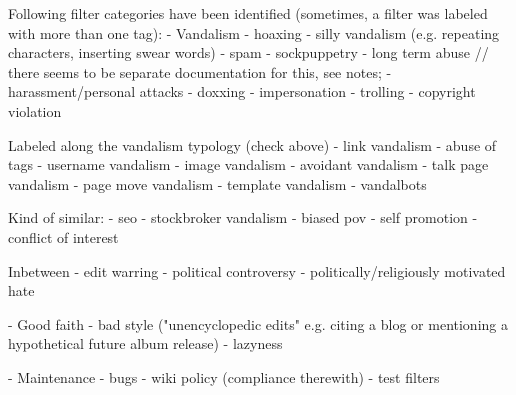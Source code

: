 Following filter categories have been identified (sometimes, a filter was labeled with more than one tag):
- Vandalism
  - hoaxing
  - silly vandalism (e.g. repeating characters, inserting swear words)
  - spam
  - sockpuppetry
  - long term abuse // there seems to be separate documentation for this, see notes;
  - harassment/personal attacks
    - doxxing
    - impersonation
  - trolling
  - copyright violation

  Labeled along the vandalism typology (check above)
  - link vandalism
  - abuse of tags
  - username vandalism
  - image vandalism
  - avoidant vandalism
  - talk page vandalism
  - page move vandalism
  - template vandalism
  - vandalbots

  Kind of similar:
  - seo
  - stockbroker vandalism
  - biased pov
  - self promotion
  - conflict of interest

Inbetween
- edit warring
- political controversy
- politically/religiously motivated hate

- Good faith
  - bad style ("unencyclopedic edits" e.g. citing a blog or mentioning a hypothetical future album release)
  - lazyness


- Maintenance
  - bugs
  - wiki policy (compliance therewith)
  - test filters

